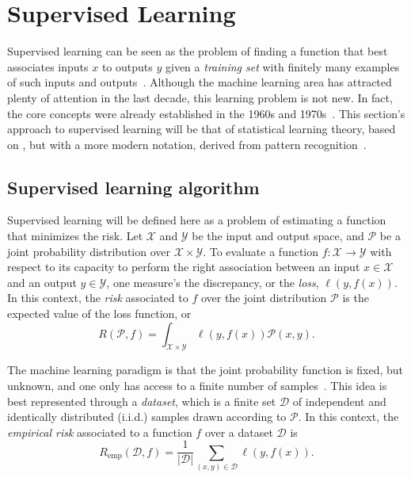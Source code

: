 \section{Supervised Learning}

Supervised learning can be seen as the problem of finding a function that best associates inputs $x$ to outputs $y$ given a \emph{training set} with finitely many examples of such inputs and outputs~\cite{Goodfellow-et-al-2016}.
Although the machine learning area has attracted plenty of attention in the last decade, this learning problem is not new.
In fact, the core concepts were already established in the 1960s and 1970s~\cite{vapnikNatureStatisticalLearning2000}.
This section's approach to supervised learning will be that of statistical learning theory, based on , but with a more modern notation, derived from pattern recognition~\cite{bishopPatternRecognitionMachine2006,hastieElementsStatisticalLearning2009}.

\subsection{Supervised learning algorithm}

Supervised learning will be defined here as a problem of estimating a function that minimizes the risk.
Let $\mathcal{X}$ and $\mathcal{Y}$ be the input and output space, and $\mathcal{P}$ be a joint probability distribution over $\mathcal{X}\times \mathcal{Y}$.
To evaluate a function $f: \mathcal{X} \longrightarrow \mathcal{Y}$ with respect to its capacity to perform the right association between an input $x\in \mathcal{X}$ and an output $y\in \mathcal{Y}$, one measure's the discrepancy, or the \emph{loss}, $\ell(y,f(x))$.
In this context, the \emph{risk} associated to $f$ over the joint distribution $\mathcal{P}$ is the expected value of the loss function, or \[
    R(\mathcal{P},f) = \int_{\mathcal{X}\times \mathcal{Y}} \ell(y,f(x))\mathcal{P}(x,y)
.\] 

The machine learning paradigm is that the joint probability function is fixed, but unknown, and one only has access to a finite number of samples~\cite{vapnikNatureStatisticalLearning2000}.
This idea is best represented through a \emph{dataset}, which is a finite set $\mathcal{D}$ of independent and identically distributed (i.i.d.) samples drawn according to $\mathcal{P}$.
In this context, the \emph{empirical risk} associated to a function $f$ over a dataset $\mathcal{D}$ is \[
    R_\textrm{emp}(\mathcal{D},f) = \frac{1}{|\mathcal{D}|} \sum_{(x,y)\in \mathcal{D}} \ell(y, f(x))
.\]

